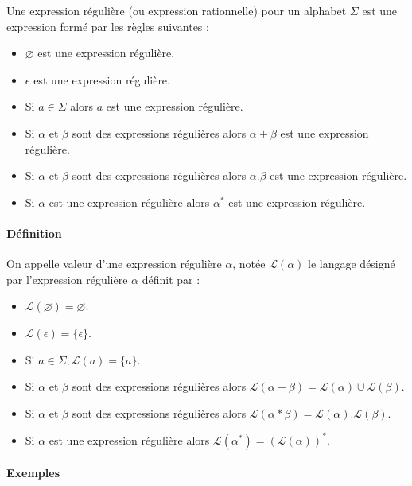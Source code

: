 Une expression régulière (ou expression rationnelle) pour un alphabet $\Sigma$ est une expression formé par les règles suivantes :

\begin{itemize}
	\item $\varnothing$ est une expression régulière.
	\item $\epsilon$ est une expression régulière.
	\item Si $a \in \Sigma$ alors $a$ est une expression régulière.
	\item Si $\alpha$ et $\beta$ sont des expressions régulières alors $\alpha + \beta$ est une expression régulière.
	\item Si $\alpha$ et $\beta$ sont des expressions régulières alors $\alpha . \beta$ est une expression régulière.
	\item Si $\alpha$ est une expression régulière alors $\alpha^*$ est une expression régulière.
\end{itemize}



\paragraph{Définition} %
\label{par:d_finition}

On appelle valeur d'une expression régulière $\alpha$, notée $\mathcal{L}(\alpha)$ le langage désigné par l'expression régulière $\alpha$ définit par :

\begin{itemize}
	\item $\mathcal{L}(\varnothing)=\varnothing$.
	\item $\mathcal{L}(\epsilon)=\{\epsilon\}$.
	\item Si $a \in \Sigma, \mathcal{L}(a)=\{a\}$.
	\item Si $\alpha$ et $\beta$ sont des expressions régulières alors $\mathcal{L}(\alpha + \beta)=\mathcal{L}(\alpha) \cup \mathcal{L}(\beta)$.
	\item Si $\alpha$ et $\beta$ sont des expressions régulières alors $\mathcal{L}(\alpha * \beta)=\mathcal{L}(\alpha) . \mathcal{L}(\beta)$.
	\item Si $\alpha$ est une expression régulière alors $\mathcal{L}(\alpha^*)=(\mathcal{L}(\alpha))^*$.
\end{itemize}



\paragraph{Exemples} %
\label{par:exemples}

